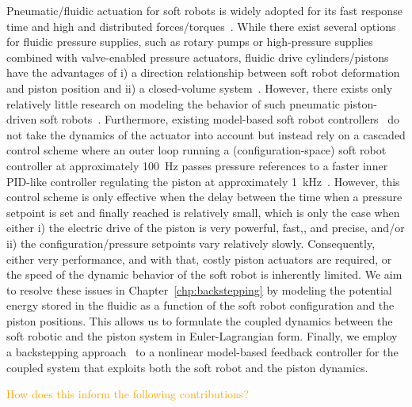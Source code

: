 Pneumatic/fluidic actuation for soft robots is widely adopted for its fast response time and high and distributed forces/torques~\cite{marchese2015recipe, zaidi2021actuation}.
While there exist several options for fluidic pressure supplies, such as rotary pumps or high-pressure supplies combined with valve-enabled pressure actuators, fluidic drive cylinders/pistons~\cite{marchese2014design, marchese2016design, parlikar2024concept, malas2024novel} have the advantages of i) a direction relationship between soft robot deformation and piston position and ii) a closed-volume system~\cite{marchese2016design}.
However, there exists only relatively little research on modeling the behavior of such pneumatic piston-driven soft robots~\cite{marchese2014design, xavier2020modelling}.
Furthermore, existing model-based soft robot controllers~\cite{della2020model, della2023model} do not take the dynamics of the actuator into account but instead rely on a cascaded control scheme where an outer loop running a (configuration-space) soft robot controller at approximately \SI{100}{Hz} passes pressure references to a faster inner PID-like controller regulating the piston at approximately \SI{1}{kHz}~\cite{marchese2014design}.
However, this control scheme is only effective when the delay between the time when a pressure setpoint is set and finally reached is relatively small, which is only the case when either i) the electric drive of the piston is very powerful, fast,, and precise, and/or ii) the configuration/pressure setpoints vary relatively slowly.
Consequently, either very performance, and with that, costly piston actuators are required, or the speed of the dynamic behavior of the soft robot is inherently limited.
We aim to resolve these issues in Chapter~\ref{chp:backstepping} by modeling the potential energy stored in the fluidic as a function of the soft robot configuration and the piston positions. This allows us to formulate the coupled dynamics between the soft robotic and the piston system in Euler-Lagrangian form. Finally, we employ a backstepping approach~\cite{kokotovic1992joy, lozano1992adaptive, khalil2002nonlinear} to a nonlinear model-based feedback controller for the coupled system that exploits both the soft robot and the piston dynamics.

\textcolor{orange}{How does this inform the following contributions?}


